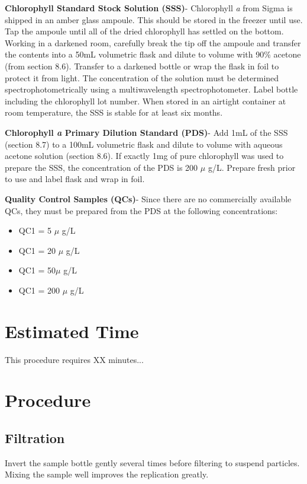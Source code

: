 \documentclass[12pt]{../SOP3}\usepackage[]{graphicx}\usepackage[]{color}
\begin{document}
\NP \textbf{Chlorophyll Standard Stock Solution (SSS)}- Chlorophyll \textit{a} from Sigma is shipped in an amber glass ampoule. This should be stored in the freezer until use. Tap the ampoule until all of the dried chlorophyll has settled on the bottom. Working in a darkened room, carefully break the tip off the ampoule and transfer the contents into a 50mL volumetric flask and dilute to volume with 90\% acetone (from section 8.6). Transfer to a darkened bottle or wrap the flask in foil to protect it from light. The concentration of the solution must be determined spectrophotometrically using a multiwavelength spectrophotometer. Label bottle including the chlorophyll lot number. When stored in an airtight container at room temperature, the SSS is stable for at least six months.

\NP \textbf{Chlorophyll \textit{a} Primary Dilution Standard (PDS)}- Add 1mL of the SSS (section 8.7) to a 100mL volumetric flask and dilute to volume with aqueous acetone solution (section 8.6). If exactly 1mg of pure chlorophyll was used to prepare the SSS, the concentration of the PDS is 200 $\mu$ g/L. Prepare fresh prior to use and label flask and wrap in foil.

\NP \textbf{Quality Control Samples (QCs)}- Since there are no commercially available QCs, they must be prepared from the PDS at the following concentrations:
\begin{itemize}
\item QC1 = 5 $\mu$ g/L
\item QC1 = 20 $\mu$ g/L
\item QC1 = 50$\mu$ g/L
\item QC1 = 200 $\mu$ g/L
\end{itemize}

\section{Estimated Time}

\NP This procedure requires XX minutes...

\section{Procedure} 


\subsection*{Filtration}
\NP Invert the sample bottle gently several times before filtering to suspend particles. Mixing the sample well improves the replication greatly.
\end{document}

